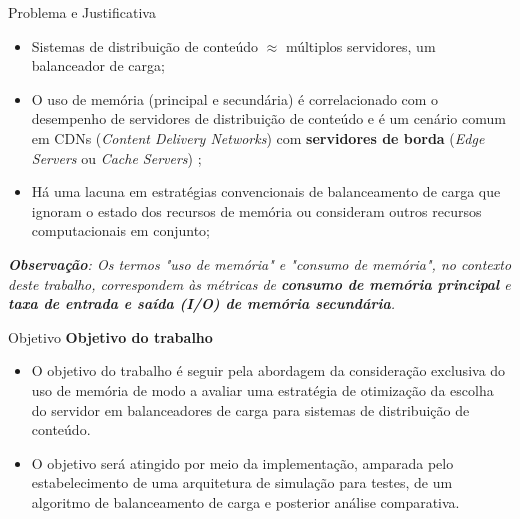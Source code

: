 \documentclass[10pt]{beamer}
\begin{document}
\begin{frame}{Problema e Justificativa}
    \begin{itemize}
        \item Sistemas de distribuição de conteúdo $\approx$ múltiplos servidores, um balanceador de carga;
        \item O uso de memória (principal e secundária) é correlacionado com o desempenho de servidores de distribuição de conteúdo e é um cenário comum em CDNs (\textit{Content Delivery Networks}) com \textbf{servidores de borda} (\textit{Edge Servers} ou \textit{Cache Servers}) \cite{surveyCDNArchitectures2025};
        \item Há uma lacuna em estratégias convencionais de balanceamento de carga que ignoram o estado dos recursos de memória ou consideram outros recursos computacionais em conjunto;
    \end{itemize}

    \vfill
    {\scriptsize \textit{\textbf{Observação}: Os termos "uso de memória" e "consumo de memória", no contexto deste trabalho, correspondem às métricas de \textbf{consumo de memória principal} e \textbf{taxa de entrada e saída (I/O) de memória secundária}.}}
\end{frame}

\begin{frame}{Objetivo}
    \textbf{Objetivo do trabalho}
    \begin{itemize}
        \item O objetivo do trabalho é seguir pela abordagem da consideração exclusiva do uso de memória de modo a avaliar uma estratégia de otimização da escolha do servidor em balanceadores de carga para sistemas de distribuição de conteúdo.
        \item O objetivo será atingido por meio da implementação, amparada pelo estabelecimento de uma arquitetura de simulação para testes, de um algoritmo de balanceamento de carga e posterior análise comparativa.
    \end{itemize}
\end{frame}



\end{document}
